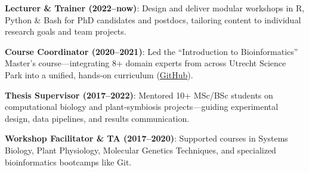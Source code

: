 \documentclass[a4paper,10pt]{article}
\begin{document}
\begin{description}
  \raggedright
  \item \textbf{Lecturer \& Trainer (2022–now)}: Design and deliver modular workshops in R, Python \& Bash for PhD candidates and postdocs, tailoring content to individual research goals and team projects.
  \item \textbf{Course Coordinator (2020–2021)}: Led the “Introduction to Bioinformatics” Master’s course—integrating 8+ domain experts from across Utrecht Science Park into a unified, hands-on curriculum (\href{https://github.com/lauralwd/metagenomicspractical}{GitHub}).
  \item \textbf{Thesis Supervisor (2017–2022)}: Mentored 10+ MSc/BSc students on computational biology and plant-symbiosis projects—guiding experimental design, data pipelines, and results communication.
  \item \textbf{Workshop Facilitator \& TA (2017–2020)}: Supported courses in Systems Biology, Plant Physiology, Molecular Genetics Techniques, and specialized bioinformatics bootcamps like Git.
\end{description}
\end{document}
